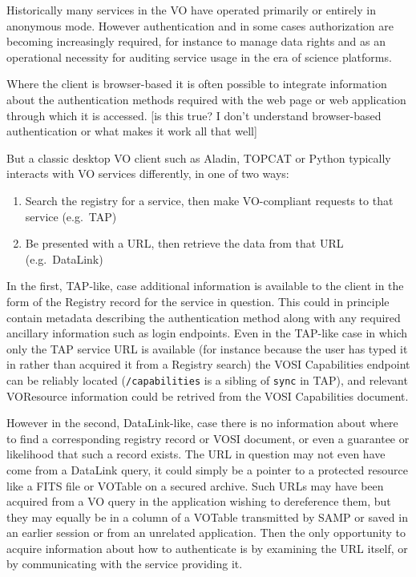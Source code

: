 \documentclass[11pt,a4paper]{ivoa}
\begin{document}
Historically many services in the VO have operated primarily or
entirely in anonymous mode.
However authentication and in some cases authorization
are becoming increasingly required,
for instance to manage data rights and as an operational necessity for
auditing service usage in the era of science platforms.

Where the client is browser-based
it is often possible to integrate information about the authentication
methods required with the web page or web application through which
it is accessed.
[is this true?  I don't understand browser-based authentication
or what makes it work all that well]

But a classic desktop VO client such as Aladin, TOPCAT or Python
typically interacts with VO services differently, in one of two
ways:
\begin{enumerate}
\item Search the registry for a service, then make VO-compliant
      requests to that service (e.g.\ TAP)
\item Be presented with a URL, then retrieve the data from that URL
      (e.g.\ DataLink)
\end{enumerate}
In the first, TAP-like, case additional information is available to the
client in the form of the Registry record for the service in question.
This could in principle contain metadata describing the authentication
method along with any required ancillary information such as
login endpoints.
Even in the TAP-like case in which only the TAP service URL is available
(for instance because the user has typed it in rather than acquired it
from a Registry search) the VOSI Capabilities endpoint can be reliably
located ({\tt /capabilities} is a sibling of {\tt sync} in TAP),
and relevant VOResource information could be retrived from the VOSI
Capabilities document.

However in the second, DataLink-like, case
there is no information about where to find a corresponding
registry record or VOSI document,
or even a guarantee or likelihood that such a record exists.
The URL in question may not even have come from a DataLink query,
it could simply be a pointer to a protected resource like a
FITS file or VOTable on a secured archive.
Such URLs may have been acquired from a VO query in the application
wishing to dereference them,
but they may equally be in a column of a VOTable transmitted by SAMP
or saved in an earlier session or from an unrelated application.
Then the only opportunity to acquire information about how to authenticate
is by examining the URL itself, or by communicating with the
service providing it.
\end{document}
